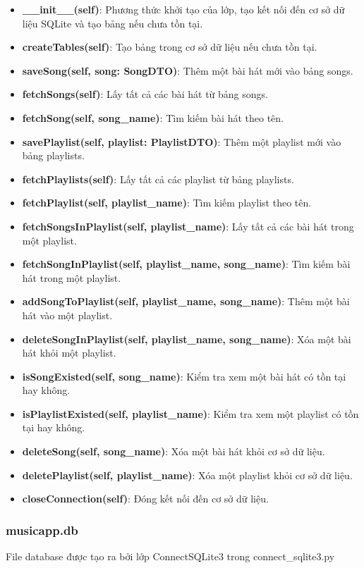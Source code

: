 \documentclass[a4paper]{article}
\begin{document}
\begin{itemize}
    \item \textbf{\_\_init\_\_(self)}: Phương thức khởi tạo của lớp, tạo kết nối đến cơ sở dữ liệu SQLite và tạo bảng nếu chưa tồn tại. 
    \item \textbf{createTables(self)}: Tạo bảng trong cơ sở dữ liệu nếu chưa tồn tại.
    \item \textbf{saveSong(self, song: SongDTO)}: Thêm một bài hát mới vào bảng songs.
    \item \textbf{fetchSongs(self)}: Lấy tất cả các bài hát từ bảng songs.
    \item \textbf{fetchSong(self, song\_name)}: Tìm kiếm bài hát theo tên.
    \item \textbf{savePlaylist(self, playlist: PlaylistDTO)}: Thêm một playlist mới vào bảng playlists.
    \item \textbf{fetchPlaylists(self)}: Lấy tất cả các playlist từ bảng playlists.
    \item \textbf{fetchPlaylist(self, playlist\_name)}: Tìm kiếm playlist theo tên.
    \item \textbf{fetchSongsInPlaylist(self, playlist\_name)}: Lấy tất cả các bài hát trong một playlist.
    \item \textbf{fetchSongInPlaylist(self, playlist\_name, song\_name)}: Tìm kiếm bài hát trong một playlist.
    \item \textbf{addSongToPlaylist(self, playlist\_name, song\_name)}: Thêm một bài hát vào một playlist.
    \item \textbf{deleteSongInPlaylist(self, playlist\_name, song\_name)}: Xóa một bài hát khỏi một playlist.
     \item \textbf{isSongExisted(self, song\_name)}: Kiểm tra xem một bài hát có tồn tại hay không.
    \item \textbf{isPlaylistExisted(self, playlist\_name)}: Kiểm tra xem một playlist có tồn tại hay không.
    \item \textbf{deleteSong(self, song\_name)}: Xóa một bài hát khỏi cơ sở dữ liệu.
    \item \textbf{deletePlaylist(self, playlist\_name)}: Xóa một playlist khỏi cơ sở dữ liệu.
    \item \textbf{closeConnection(self)}: Đóng kết nối đến cơ sở dữ liệu.
\end{itemize}

\subsubsection{musicapp.db}
File database được tạo ra bởi lớp ConnectSQLite3 trong connect\_sqlite3.py
\end{document}
